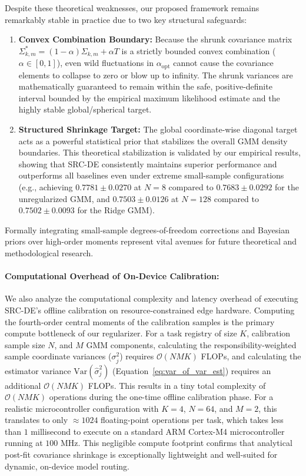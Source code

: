 Despite these theoretical weaknesses, our proposed framework remains remarkably stable in practice due to two key structural safeguards:
\begin{enumerate}
    \item {\bf Convex Combination Boundary:} Because the shrunk covariance matrix $\Sigma^{*}_{k, m} = (1 - \alpha) \Sigma_{k, m} + \alpha T$ is a strictly bounded convex combination ($\alpha \in [0, 1]$), even wild fluctuations in $\alpha_{\text{opt}}$ cannot cause the covariance elements to collapse to zero or blow up to infinity. The shrunk variances are mathematically guaranteed to remain within the safe, positive-definite interval bounded by the empirical maximum likelihood estimate and the highly stable global/spherical target.
    \item {\bf Structured Shrinkage Target:} The global coordinate-wise diagonal target acts as a powerful statistical prior that stabilizes the overall GMM density boundaries. This theoretical stabilization is validated by our empirical results, showing that SRC-DE consistently maintains superior performance and outperforms all baselines even under extreme small-sample configurations (e.g., achieving $0.7781 \pm 0.0270$ at $N=8$ compared to $0.7683 \pm 0.0292$ for the unregularized GMM, and $0.7503 \pm 0.0126$ at $N=128$ compared to $0.7502 \pm 0.0093$ for the Ridge GMM).
\end{enumerate}
Formally integrating small-sample degrees-of-freedom corrections and Bayesian priors over high-order moments represent vital avenues for future theoretical and methodological research.

\paragraph{Computational Overhead of On-Device Calibration:} We also analyze the computational complexity and latency overhead of executing SRC-DE's offline calibration on resource-constrained edge hardware. Computing the fourth-order central moments of the calibration samples is the primary compute bottleneck of our regularizer. For a task registry of size $K$, calibration sample size $N$, and $M$ GMM components, calculating the responsibility-weighted sample coordinate variances ($\sigma^2_j$) requires $\mathcal{O}(N M K)$ FLOPs, and calculating the estimator variance $\text{Var}(\hat{\sigma}^2_j)$ (Equation~\ref{eq:var_of_var_est}) requires an additional $\mathcal{O}(N M K)$ FLOPs. This results in a tiny total complexity of $\mathcal{O}(N M K)$ operations during the one-time offline calibration phase. For a realistic microcontroller configuration with $K=4$, $N=64$, and $M=2$, this translates to only $\approx 1024$ floating-point operations per task, which takes less than $1$ millisecond to execute on a standard ARM Cortex-M4 microcontroller running at $100$ MHz. This negligible compute footprint confirms that analytical post-fit covariance shrinkage is exceptionally lightweight and well-suited for dynamic, on-device model routing.

